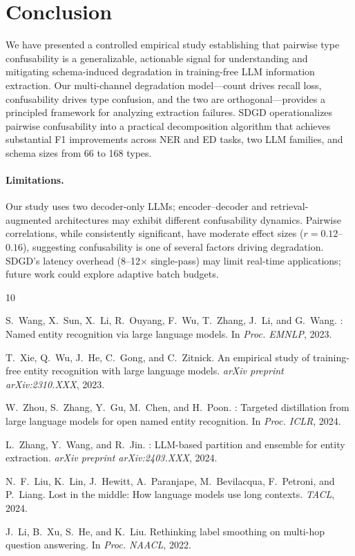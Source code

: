 \documentclass[11pt,a4paper]{article}
\begin{document}
\section{Conclusion}
\label{sec:conclusion}

We have presented a controlled empirical study establishing that pairwise type confusability is a generalizable, actionable signal for understanding and mitigating schema-induced degradation in training-free LLM information extraction.
Our multi-channel degradation model---count drives recall loss, confusability drives type confusion, and the two are orthogonal---provides a principled framework for analyzing extraction failures.
SDGD operationalizes pairwise confusability into a practical decomposition algorithm that achieves substantial F1 improvements across NER and ED tasks, two LLM families, and schema sizes from 66 to 168 types.

\paragraph{Limitations.}
Our study uses two decoder-only LLMs; encoder--decoder and retrieval-augmented architectures may exhibit different confusability dynamics.
Pairwise correlations, while consistently significant, have moderate effect sizes ($r = 0.12$--$0.16$), suggesting confusability is one of several factors driving degradation.
SDGD's latency overhead (8--12$\times$ single-pass) may limit real-time applications; future work could explore adaptive batch budgets.

\begin{thebibliography}{10}

S.~Wang, X.~Sun, X.~Li, R.~Ouyang, F.~Wu, T.~Zhang, J.~Li, and G.~Wang.
: Named entity recognition via large language models.
\newblock In \emph{Proc. EMNLP}, 2023.

T.~Xie, Q.~Wu, J.~He, C.~Gong, and C.~Zitnick.
\newblock An empirical study of training-free entity recognition with large language models.
\newblock \emph{arXiv preprint arXiv:2310.XXX}, 2023.

W.~Zhou, S.~Zhang, Y.~Gu, M.~Chen, and H.~Poon.
: Targeted distillation from large language models for open named entity recognition.
\newblock In \emph{Proc. ICLR}, 2024.

L.~Zhang, Y.~Wang, and R.~Jin.
: LLM-based partition and ensemble for entity extraction.
\newblock \emph{arXiv preprint arXiv:2403.XXX}, 2024.

N.~F.~Liu, K.~Lin, J.~Hewitt, A.~Paranjape, M.~Bevilacqua, F.~Petroni, and P.~Liang.
\newblock Lost in the middle: How language models use long contexts.
\newblock \emph{TACL}, 2024.

J.~Li, B.~Xu, S.~He, and K.~Liu.
\newblock Rethinking label smoothing on multi-hop question answering.
\newblock In \emph{Proc. NAACL}, 2022.

\end{thebibliography}
\end{document}
